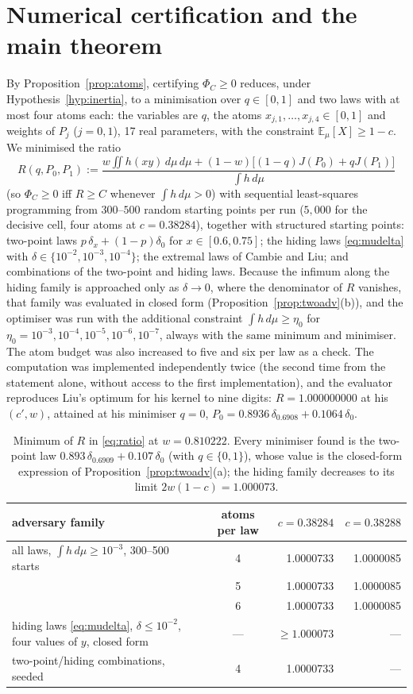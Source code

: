 \documentclass[11pt,a4paper]{article}
\theoremstyle{definition}
\theoremstyle{remark}
\newcommand{\E}{\mathbb{E}}
\newcommand{\ent}{h}
\begin{document}
\section{Numerical certification and the main theorem}\label{sec:numerics}
By Proposition~\ref{prop:atoms}, certifying $\Phi_C\ge0$ reduces, under Hypothesis~\ref{hyp:inertia}, to a minimisation over $q\in[0,1]$ and two laws with at most four atoms each: the variables are $q$, the atoms $x_{j,1},\dots,x_{j,4}\in[0,1]$ and weights of $P_j$ ($j=0,1$), 17 real parameters, with the constraint $\E_\mu[X]\ge1-c$. We minimised the ratio
\begin{equation}\label{eq:ratio}
R(q,P_0,P_1):=\frac{w\iint\ent(xy)\,d\mu\,d\mu+(1-w)\big[(1-q)J(P_0)+qJ(P_1)\big]}{\int\ent\,d\mu}
\end{equation}
(so $\Phi_C\ge0$ iff $R\ge C$ whenever $\int\ent\,d\mu>0$) with sequential least-squares programming from $300$--$500$ random starting points per run ($5{,}000$ for the decisive cell, four atoms at $c=0.38284$), together with structured starting points: two-point laws $p\,\delta_x+(1-p)\delta_0$ for $x\in[0.6,0.75]$; the hiding laws \eqref{eq:mudelta} with $\delta\in\{10^{-2},10^{-3},10^{-4}\}$; the extremal laws of Cambie and Liu; and combinations of the two-point and hiding laws. Because the infimum along the hiding family is approached only as $\delta\to0$, where the denominator of $R$ vanishes, that family was evaluated in closed form (Proposition~\ref{prop:twoadv}(b)), and the optimiser was run with the additional constraint $\int\ent\,d\mu\ge\eta_0$ for $\eta_0=10^{-3},10^{-4},10^{-5},10^{-6},10^{-7}$, always with the same minimum and minimiser. The atom budget was also increased to five and six per law as a check. The computation was implemented independently twice (the second time from the statement alone, without access to the first implementation), and the evaluator reproduces Liu's optimum for his kernel to nine digits: $R=1.000000000$ at his $(c',w)$, attained at his minimiser $q=0$, $P_0=0.8936\,\delta_{0.6908}+0.1064\,\delta_0$.

\begin{table}[h]\centering\footnotesize
\begin{tabular}{lcrr}\toprule
adversary family & atoms per law & $c=0.38284$ & $c=0.38288$\\\midrule
all laws, $\int\ent\,d\mu\ge10^{-3}$, 300--500 starts & 4 & 1.0000733 & 1.0000085\\
 & 5 & 1.0000733 & 1.0000085\\
 & 6 & 1.0000733 & 1.0000085\\
hiding laws \eqref{eq:mudelta}, $\delta\le10^{-2}$, four values of $y$, closed form & --- & $\ge1.000073$ & ---\\
two-point/hiding combinations, seeded & 4 & 1.0000733 & ---\\\bottomrule
\end{tabular}
\caption{Minimum of $R$ in \eqref{eq:ratio} at $w=0.810222$. Every minimiser found is the two-point law $0.893\,\delta_{0.6909}+0.107\,\delta_0$ (with $q\in\{0,1\}$), whose value is the closed-form expression of Proposition~\ref{prop:twoadv}(a); the hiding family decreases to its limit $2w(1-c)=1.000073$.}\label{tab:cert}
\end{table}
\end{document}
